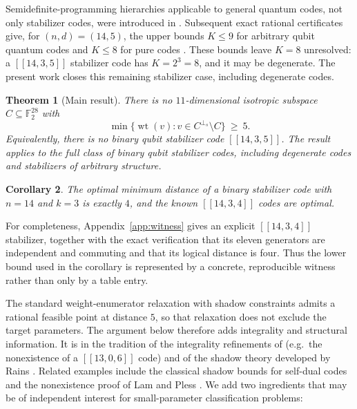 \documentclass[11pt]{amsart}
\newtheorem{theorem}{Theorem}[section]
\newtheorem{corollary}[theorem]{Corollary}
\theoremstyle{definition}
\theoremstyle{remark}
\DeclareMathOperator{\wt}{wt}
\newcommand{\F}{\mathbb{F}}
\newcommand{\perps}{{\perp_s}}
\newcommand{\code}[1]{[\![#1]\!]}
\begin{document}
Semidefinite-programming hierarchies applicable to general quantum codes,
not only stabilizer codes, were introduced in
\cite{AnglesMunneNemecHuberSDP}.  Subsequent exact rational certificates give,
for $(n,d)=(14,5)$, the upper bounds $K\le 9$ for arbitrary qubit quantum
codes and $K\le 8$ for pure codes \cite{AnglesMunneHuberCertificates}.
These bounds leave $K=8$ unresolved: a $\code{14,3,5}$ stabilizer code has
$K=2^3=8$, and it may be degenerate.  The present work closes this remaining
stabilizer case, including degenerate codes.

\begin{theorem}[Main result]\label{thm:main}
There is no $11$-dimensional isotropic subspace $C\subseteq\F_2^{28}$ with
\[
\min\{\wt(v):v\in C^{\perps}\setminus C\}\ \ge\ 5 .
\]
Equivalently, there is no binary qubit stabilizer code $\code{14,3,5}$.
The result applies to the full class of binary qubit stabilizer codes,
including degenerate codes and stabilizers of arbitrary structure.
\end{theorem}

\begin{corollary}\label{cor:tables}
The optimal minimum distance of a binary stabilizer code with $n=14$ and
$k=3$ is exactly $4$, and the known $\code{14,3,4}$ codes are optimal.
\end{corollary}

For completeness, Appendix~\ref{app:witness} gives an explicit
$\code{14,3,4}$ stabilizer, together with the exact verification that its
eleven generators are independent and commuting and that its logical
distance is four.  Thus the lower bound used in the corollary is represented
by a concrete, reproducible witness rather than only by a table entry.

The standard weight-enumerator relaxation with shadow constraints admits a
rational feasible point at distance $5$, so that relaxation does not exclude
the target parameters.  The argument below therefore adds integrality and
structural information.  It is in the tradition of the
integrality refinements of \cite[\S 7]{CRSS1998} (e.g.\ the nonexistence
of a $\code{13,0,6}$ code) and of the shadow theory developed by Rains
\cite{Rains1999Shadow}.  Related examples include the classical shadow bounds
for self-dual codes \cite{RainsSloane1998} and the nonexistence proof of Lam
and Pless \cite{LamPless1990}.  We add two ingredients that may be of
independent interest for small-parameter classification problems:
\end{document}
